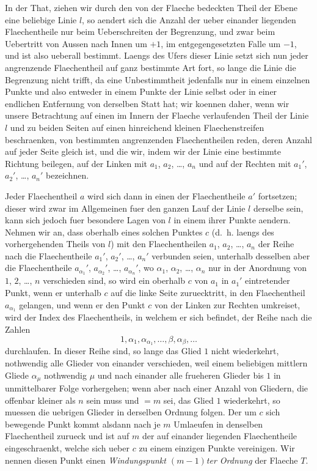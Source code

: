 \documentclass[11pt,a4paper]{article}
\theoremstyle{plain}
\theoremstyle{definition}
\begin{document}
In der That, ziehen wir durch den von der Flaeche bedeckten Theil der Ebene eine beliebige Linie $l$, so aendert sich die Anzahl der ueber einander liegenden Flaechentheile nur beim Ueberschreiten der Begrenzung, und zwar beim Uebertritt von Aussen nach Innen um $+1$, im entgegengesetzten Falle um $-1$, und ist also ueberall bestimmt. Laengs des Ufers dieser Linie setzt sich nun jeder angrenzende Flaechentheil auf ganz bestimmte Art fort, so lange die Linie die Begrenzung nicht trifft, da eine Unbestimmtheit jedenfalls nur in einem einzelnen Punkte und also entweder in einem Punkte der Linie selbst oder in einer endlichen Entfernung von derselben Statt hat; wir koennen daher, wenn wir unsere Betrachtung auf einen im Innern der Flaeche verlaufenden Theil der Linie $l$ und zu beiden Seiten auf einen hinreichend kleinen Flaechenstreifen beschraenken, von bestimmten angrenzenden Flaechentheilen reden, deren Anzahl auf jeder Seite gleich ist, und die wir, indem wir der Linie eine bestimmte Richtung beilegen, auf der Linken mit $a_1$, $a_2$, \dots, $a_n$ und auf der Rechten mit $a_1'$, $a_2'$, \dots, $a_n'$ bezeichnen.

Jeder Flaechentheil $a$ wird sich dann in einen der Flaechentheile $a'$ fortsetzen; dieser wird zwar im Allgemeinen fuer den ganzen Lauf der Linie $l$ derselbe sein, kann sich jedoch fuer besondere Lagen von $l$ in einem ihrer Punkte aendern. Nehmen wir an, dass oberhalb eines solchen Punktes $c$ (d.\ h. laengs des vorhergehenden Theils von $l$) mit den Flaechentheilen $a_1$, $a_2$, \dots, $a_n$ der Reihe nach die Flaechentheile $a_1'$, $a_2'$, \dots, $a_n'$ verbunden seien, unterhalb desselben aber die Flaechentheile $a_{\alpha_1}'$, $a_{\alpha_2}'$, \dots, $a_{\alpha_n}'$, wo $\alpha_1$, $\alpha_2$, \dots, $\alpha_n$ nur in der Anordnung von $1$, $2$, \dots, $n$ verschieden sind, so wird ein oberhalb $c$ von $a_1$ in $a_1'$ eintretender Punkt, wenn er unterhalb $c$ auf die linke Seite zuruecktritt, in den Flaechentheil $a_{\alpha_1}$ gelangen, und wenn er den Punkt $c$ von der Linken zur Rechten umkreiset, wird der Index des Flaechentheils, in welchem er sich befindet, der Reihe nach die Zahlen
\[
1, \alpha_1, \alpha_{\alpha_1}, \dots, \beta, \alpha_\beta, \dots
\]
durchlaufen. In dieser Reihe sind, so lange das Glied $1$ nicht wiederkehrt, nothwendig alle Glieder von einander verschieden, weil einem beliebigen mittlern Gliede $\alpha_\mu$ nothwendig $\mu$ und nach einander alle frueheren Glieder bis $1$ in unmittelbarer Folge vorhergehen; wenn aber nach einer Anzahl von Gliedern, die offenbar kleiner als $n$ sein muss und $= m$ sei, das Glied $1$ wiederkehrt, so muessen die uebrigen Glieder in derselben Ordnung folgen. Der um $c$ sich bewegende Punkt kommt alsdann nach je $m$ Umlaeufen in denselben Flaechentheil zurueck und ist auf $m$ der auf einander liegenden Flaechentheile eingeschraenkt, welche sich ueber $c$ zu einem einzigen Punkte vereinigen. Wir nennen diesen Punkt einen \emph{Windungspunkt $(m-1)$ter Ordnung} der Flaeche $T$.
\end{document}
